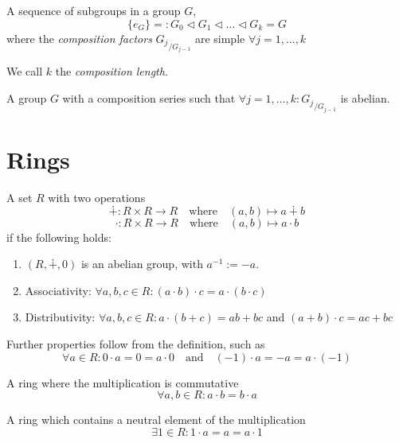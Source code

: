 \begin{definition}
   A sequence of subgroups in a group \(G\),
   \[\{e_G\} =: G_0 \triangleleft G_1 \triangleleft \ldots \triangleleft G_k = G\]
   where the \emph{composition factors} \({G_j}_{/G_{j-1}}\) are simple \(\forall j = 1, \ldots, k\)
\end{definition}
\begin{remark}
   We call \(k\) the \emph{composition length}.
\end{remark}

\begin{definition}
   A group \(G\) with a composition series such that \(\forall j = 1, \ldots, k: {G_j}_{/G_{j-1}}\) is abelian.
\end{definition}

\section{Rings}
\begin{definition}[Ring]
   A set \(R\) with two operations
   \[\dotplus: R \times R \to R \quad\text{where}\quad (a, b) \mapsto a \dotplus b\]
   \[\cdot: R \times R \to R \quad\text{where}\quad (a, b) \mapsto a \cdot b\]
   if the following holds:
   \begin{enumerate}[label=\roman*, align=Center]
      \item \((R, \dotplus, 0)\) is an abelian group, with \(a^{-1} := -a\).
      \item Associativity: \(\forall a, b, c \in R: (a \cdot b) \cdot c = a \cdot (b \cdot c)\)
      \item Distributivity: \(\forall a, b, c \in R: a \cdot (b + c) = ab + bc\) and \((a + b) \cdot c = ac + bc\)
   \end{enumerate}
\end{definition}
\begin{remark}
   Further properties follow from the definition, such as
   \[\forall a \in R: 0 \cdot a = 0 = a \cdot 0 \quad\text{and}\quad (-1) \cdot a = -a = a \cdot (-1)\]
\end{remark}

\begin{definition}
   A ring where the multiplication is commutative
   \[\forall a, b \in R: a \cdot b = b \cdot a\]
\end{definition}

\begin{definition}
   A ring which contains a neutral element of the multiplication
   \[\exists 1 \in R: 1 \cdot a = a = a \cdot 1\]
\end{definition}

